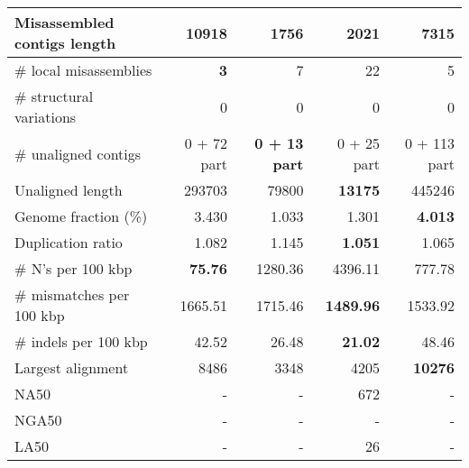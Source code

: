 \documentclass[12pt,a4paper]{article}
\begin{document}
\begin{table}[ht]
\begin{center}
\begin{tabular}{|l*{4}{|r}|}
Misassembled contigs length & 10918 & {\bf 1756} & 2021 & 7315 \\ \hline
\# local misassemblies & {\bf 3} & 7 & 22 & 5 \\ \hline
\# structural variations & 0 & 0 & 0 & 0 \\ \hline
\# unaligned contigs & 0 + 72 part & {\bf 0 + 13 part} & 0 + 25 part & 0 + 113 part \\ \hline
Unaligned length & 293703 & 79800 & {\bf 13175} & 445246 \\ \hline
Genome fraction (\%) & 3.430 & 1.033 & 1.301 & {\bf 4.013} \\ \hline
Duplication ratio & 1.082 & 1.145 & {\bf 1.051} & 1.065 \\ \hline
\# N's per 100 kbp & {\bf 75.76} & 1280.36 & 4396.11 & 777.78 \\ \hline
\# mismatches per 100 kbp & 1665.51 & 1715.46 & {\bf 1489.96} & 1533.92 \\ \hline
\# indels per 100 kbp & 42.52 & 26.48 & {\bf 21.02} & 48.46 \\ \hline
Largest alignment & 8486 & 3348 & 4205 & {\bf 10276} \\ \hline
NA50 & - & - & 672 & - \\ \hline
NGA50 & - & - & - & - \\ \hline
LA50 & - & - & 26 & - \\ \hline
\end{tabular}
\end{center}
\end{table}
\end{document}
